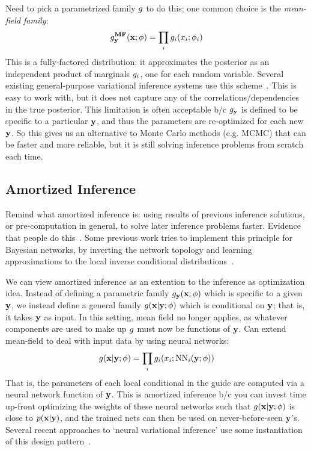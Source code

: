 Need to pick a parametrized family $g$ to do this; one common choice is the \emph{mean-field family}:
\begin{equation*}
g^{\textbf{MF}}_{\mathbf{y}}(\mathbf{x} ; \phi) = \prod_i g_i(x_i ; \phi_i)
\end{equation*}
This is a fully-factored distribution: it approximates the posterior as an independent product of marginals $g_i$, one for each random variable.
Several existing general-purpose variational inference systems use this scheme~\cite{AVIPP,BBVI}.
This is easy to work with, but it does not capture any of the correlations/dependencies in the true posterior.
This limitation is often acceptable b/c $g_{\mathbf{y}}$ is defined to be specific to a particular $\mathbf{y}$, and thus the parameters are re-optimized for each new $\mathbf{y}$.
So this gives us an alternative to Monte Carlo methods (e.g. MCMC) that can be faster and more reliable, but it is still solving inference problems from scratch each time.

\subsection{Amortized Inference}

Remind what amortized inference is: using results of previous inference solutions, or pre-computation in general, to solve later inference problems faster.
Evidence that people do this~\cite{AmortizedInference}.
Some previous work tries to implement this principle for Bayesian networks, by inverting the network topology and learning approximations to the local inverse conditional distributions~\cite{StochasticInverses,NeuralStochasticInverses}.

We can view amortized inference as an extention to the inference as optimization idea.
Instead of defining a parametric family $g_{\mathbf{y}}(\mathbf{x} ; \phi)$ which is specific to a given $\mathbf{y}$, we instead define a general family $g(\mathbf{x} | \mathbf{y} ; \phi)$ which is conditional on $\mathbf{y}$; that is, it takes $\mathbf{y}$ as input.
In this setting, mean field no longer applies, as whatever components are used to make up $g$ must now be functions of $\mathbf{y}$.
Can extend mean-field to deal with input data by using neural networks:
\begin{equation*}
g(\mathbf{x} | \mathbf{y} ; \phi) = \prod_i g_i(x_i ; \text{NN}_i(\mathbf{y} ; \phi))
\end{equation*}
That is, the parameters of each local conditional in the guide are computed via a neural network function of $\mathbf{y}$.
This is amortized inference b/c you can invest time up-front optimizing the weights of these neural networks such that $g(\mathbf{x} | \mathbf{y} ; \phi)$ is close to $p(\mathbf{x} | \mathbf{y})$, and the trained nets can then be used on never-before-seen $\mathbf{y}$'s.
Several recent approaches to `neural variational inference' use some instantiation of this design pattern~\cite{NVIL,DLGM,AEVB}.

